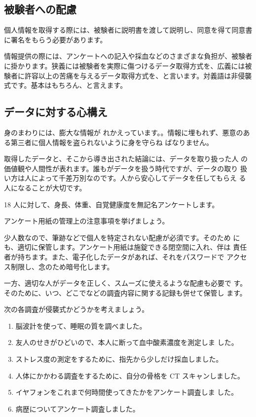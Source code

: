 \subsection{被験者への配慮}
個人情報を取得する際には、被験者に説明書を渡して説明し、同意を得て同意書に署名をもらう必要があります。 

情報提供の際には、アンケートへの記入や採血などのさまざまな負担が、被験者に掛かります。狭義には被験者を実際に傷つけるデータ取得方式を、広義には被験者に許容以上の苦痛を与えるデータ取得方式を、と言います。対義語は非侵襲式です。基本はもちろん、と言えます。

\subsection{データに対する心構え}
身のまわりには、膨大な情報が れかえっています。。情報に埋もれず、悪意のある第三者に個人情報を盗られないように身を守らね ばなりません。

取得したデータと、そこから導き出された結論には、データを取り扱った人 の価値観や人間性が表れます。誰もがデータを扱う時代ですが、データの取り 扱い方は人によって千差万別なのです。人から安心してデータを任してもらえ る人になることが大切です。 

\begin{simQ}
18 人に対して、身長、体重、自覚健康度を無記名アンケートします。

アンケート用紙の管理上の注意事項を挙げましょう。
\end{simQ}

\begin{simA}
少人数なので、筆跡などで個人を特定されない配慮が必須です。そのため にも、適切に保管します。アンケート用紙は施錠できる閉空間に入れ、伴は 責任者が持ちます。また、電子化したデータがあれば、それをパスワードで アクセス制限し、念のため暗号化します。 

一方、適切な人がデータを正しく、スムーズに使えるような配慮も必要で す。そのために、いつ、どこでなどの調査内容に関する記録も併せて保管し ます。
\end{simA}

\begin{simQ}
次の各調査が侵襲式かどうかを考えましょう。
\begin{enumerate}[label=(\arabic*), itemsep=0pt, parsep=0pt]
    \item 脳波計を使って、睡眠の質を調べました。
    \item 友人のせきがひどいので、本人に断って血中酸素濃度を測定しま した。 
    \item ストレス度の測定をするために、指先から少しだけ採血しました。
    \item 人体にかかわる調査をするために、自分の骨格を CT スキャンしました。
    \item イヤフォンをこれまで何時間使ってきたかをアンケート調査しま した。 
    \item 病歴についてアンケート調査しました。
\end{enumerate}
\end{simQ}

